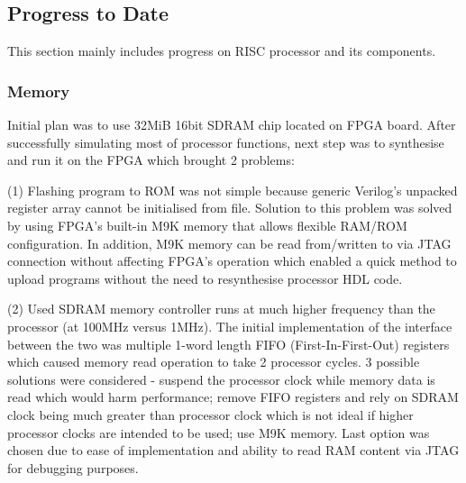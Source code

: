 \documentclass[a4paper,12pt]{article}
\begin{document}
\begin{multicols}{2}

\subsection{Progress to Date}
This section mainly includes progress on RISC processor and its components.

\subsubsection{Memory} \label{sec:memory}
Initial plan was to use 32MiB 16bit SDRAM chip located on FPGA board. After successfully simulating most of processor functions, next step was to synthesise and run it on the FPGA which brought 2 problems: 

(1) Flashing program to ROM was not simple because generic Verilog's unpacked register array cannot be initialised from file. Solution to this problem was solved by using FPGA's built-in M9K memory that allows flexible RAM/ROM configuration. In addition, M9K memory can be read from/written to via JTAG connection without affecting FPGA's operation which enabled a quick method to upload programs without the need to resynthesise processor HDL code.

(2) Used SDRAM memory controller runs at much higher frequency than the processor (at 100MHz versus 1MHz). The initial implementation of the interface between the two was multiple 1-word length FIFO (First-In-First-Out) registers which caused memory read operation to take 2 processor cycles. 3 possible solutions were considered - suspend the processor clock while memory data is read which would harm performance; remove FIFO registers and rely on SDRAM clock being much greater than processor clock which is not ideal if higher processor clocks are intended to be used; use M9K memory. Last option was chosen due to ease of implementation and ability to read RAM content via JTAG for debugging purposes.


\end{multicols}
\end{document}
